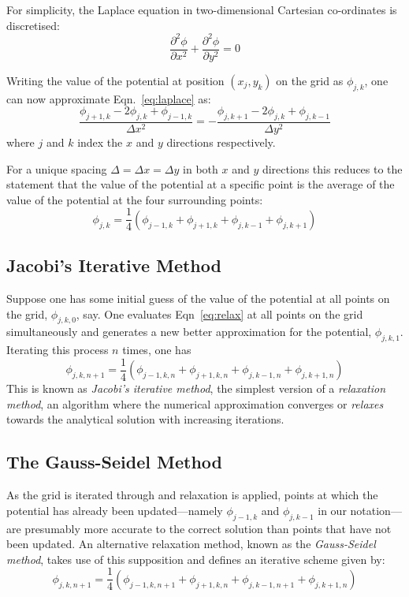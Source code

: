 \documentclass[12pt, a4paper]{article}
\newcommand{\be}{\begin{equation}}
\newcommand{\ee}{\end{equation}}
\begin{document}
For simplicity, the Laplace equation in two-dimensional Cartesian co-ordinates is
discretised:
% 
\be 
\frac{\partial^2 \phi}{\partial x^2}+\frac{\partial^2 \phi}{\partial y^2} = 0
\label{eq:laplace}
\ee 

Writing the value of the potential at position $(x_j,y_k)$ on the grid as $\phi_{j,k}$,
one can now approximate Eqn.~\ref{eq:laplace} as:
% 
\be
\frac{\phi_{j+1,k}-2\phi_{j,k}+\phi_{j-1,k}}{\Delta x^2} = - \frac{\phi_{j,k+1}-2\phi_{j,k}+\phi_{j,k-1}}{\Delta y^2}
\ee
%
where $j$ and $k$ index the $x$ and $y$ directions respectively.

For a unique spacing $\Delta=\Delta x=\Delta y$ in both $x$ and $y$ directions this
reduces to the statement that the value of the potential at a specific point is the
average of the value of the potential at the four surrounding points: 
%
\be
\phi_{j,k}= \frac{1}{4}(\phi_{j-1,k}+\phi_{j+1,k}+\phi_{j,k-1}+\phi_{j,k+1})
\label{eq:relax}
\ee

\subsection{Jacobi's Iterative Method}

Suppose one has some initial guess of the value of the potential at all points on the
grid, $\phi_{j,k,0}$, say. One evaluates Eqn~\ref{eq:relax} at all points on the grid
simultaneously and generates a new better approximation for the potential,
$\phi_{j,k,1}$. Iterating this process $n$ times, one has
%
\be
\phi_{j,k,n+1}= \frac{1}{4}(\phi_{j-1,k,n}+\phi_{j+1,k,n}+\phi_{j,k-1,n}+\phi_{j,k+1,n})
\ee
%
This is known as \emph{Jacobi's iterative method}, the simplest version of a
\emph{relaxation method}, an algorithm where the numerical approximation converges or
\emph{relaxes} towards the analytical solution with increasing iterations. 

\subsection{The Gauss-Seidel Method}

As the grid is iterated through and relaxation is applied, points at which the potential
has already been updated---namely $\phi_{j-1,k}$ and $\phi_{j,k-1}$ in our notation---are
presumably more accurate to the correct solution than points that have not been updated.
An alternative relaxation method, known as the \emph{Gauss-Seidel method}, takes use of
this supposition and defines an iterative scheme given by:
%
\be
\phi_{j,k,n+1}= \frac{1}{4}(\phi_{j-1,k,n+1}+\phi_{j+1,k,n}+\phi_{j,k-1,n+1}+\phi_{j,k+1,n})
\ee
\end{document}
